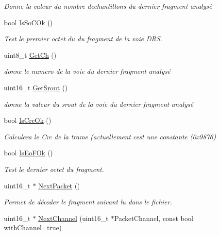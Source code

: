 \begin{DoxyCompactItemize}
\begin{DoxyCompactList}\small\item\em Donne la valeur du nombre d\textquotesingle{}echantillons du dernier fragment analysé \end{DoxyCompactList}\item 
bool \hyperlink{class_decode_frame_aa778340ea2650ce866f2aac9a59368d4}{Is\+So\+C\+Ok} ()
\begin{DoxyCompactList}\small\item\em Test le premier octet du du fragment de la voie D\+RS. \end{DoxyCompactList}\item 
uint8\+\_\+t \hyperlink{class_decode_frame_a9a29ecf0f789fb4afaf0d6fc1fbe9cc2}{Get\+Ch} ()
\begin{DoxyCompactList}\small\item\em donne le numero de la voie du dernier fragment analysé \end{DoxyCompactList}\item 
uint16\+\_\+t \hyperlink{class_decode_frame_a7418f106eb0998d886ce5849cfb031d9}{Get\+Srout} ()
\begin{DoxyCompactList}\small\item\em donne la valeur du srout de la voie du dernier fragment analysé \end{DoxyCompactList}\item 
bool \hyperlink{class_decode_frame_a239ca7a7a2ffe98f2221137a6119139d}{Is\+Crc\+Ok} ()
\begin{DoxyCompactList}\small\item\em Calculera le Crc de la trame (actuellement c\textquotesingle{}est une constante (0x9876) \end{DoxyCompactList}\item 
bool \hyperlink{class_decode_frame_aff3430f81b2b782784b06bfca9616d9f}{Is\+Eo\+F\+Ok} ()
\begin{DoxyCompactList}\small\item\em Test le dernier octet du fragment. \end{DoxyCompactList}\item 
uint16\+\_\+t $\ast$ \hyperlink{class_decode_frame_ad84d2562141edd3b4558cb2eb4e829c7}{Next\+Packet} ()
\begin{DoxyCompactList}\small\item\em Permet de décoder le fragment suivant lu dans le fichier. \end{DoxyCompactList}\item 
uint16\+\_\+t $\ast$ \hyperlink{class_decode_frame_a067beb626d53137bfa6a331cfc963b5c}{Next\+Channel} (uint16\+\_\+t $\ast$Packet\+Channel, const bool with\+Channel=true)

\end{DoxyCompactItemize}
